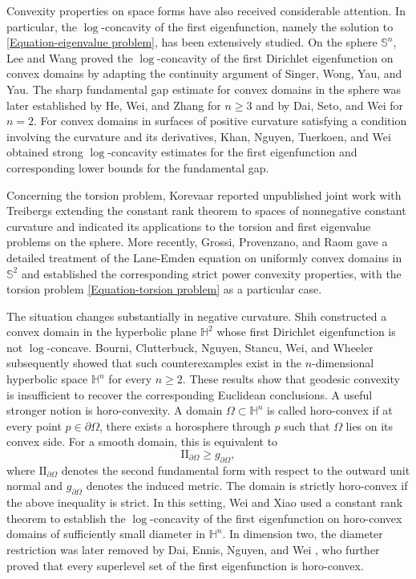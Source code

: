 \documentclass[11pt]{amsart}
\numberwithin{theorem}{section}
\numberwithin{equation}{section}
\begin{document}
Convexity properties on space forms have also received considerable attention. In particular, the $\log$-concavity of the first eigenfunction, namely the solution to \eqref{Equation-eigenvalue problem}, has been extensively studied. On the sphere $\mathbb{S}^n$, Lee and Wang \cite{Lee-Wang1987} proved the $\log$-concavity of the first Dirichlet eigenfunction on convex domains by adapting the continuity argument of  Singer, Wong, Yau, and Yau. The sharp fundamental gap estimate for convex domains in the sphere was later established by He, Wei, and Zhang \cite{He-WZ2020} for $n\geq 3$ and by Dai, Seto, and Wei \cite{Dai-SW2021} for $n=2$. For convex domains in surfaces of positive curvature satisfying a condition involving the curvature and its derivatives, Khan, Nguyen, Tuerkoen, and Wei \cite{Khan-NTW2025} obtained strong $\log$-concavity estimates for the first eigenfunction and corresponding lower bounds for the fundamental gap.

Concerning the torsion problem, Korevaar \cite{Korevaar1987} reported unpublished joint work with Treibergs extending the constant rank theorem to spaces of nonnegative constant curvature and indicated its applications to the torsion and first eigenvalue problems on the sphere. More recently, Grossi, Provenzano, and Raom \cite{Grossi-PRarXiv2026} gave a detailed treatment of the Lane-Emden equation on uniformly convex domains in $\mathbb{S}^2$ and established the corresponding strict power convexity properties, with the torsion problem \eqref{Equation-torsion problem} as a particular case.

The situation changes substantially in negative curvature. Shih \cite{Shih1989} constructed a convex domain in the hyperbolic plane $\mathbb{H}^2$ whose first Dirichlet eigenfunction is not $\log$-concave. Bourni, Clutterbuck, Nguyen, Stancu, Wei, and Wheeler \cite{Bourni-CNSWW2022} subsequently showed that such counterexamples exist in the $n$-dimensional hyperbolic space $\mathbb{H}^n$ for every $n\geq 2$. These results show that geodesic convexity is insufficient to recover the corresponding Euclidean conclusions. A useful stronger notion is horo-convexity. A domain $\Omega\subset\mathbb{H}^n$ is called horo-convex if at every point $p\in\partial\Omega$, there exists a horosphere through $p$ such that $\Omega$ lies on its convex side. For a smooth domain, this is equivalent to $$\mathrm{II}_{\partial\Omega}\geq g_{\partial\Omega},$$ where $\mathrm{II}_{\partial\Omega}$ denotes the second fundamental form with respect to the outward unit normal and $g_{\partial\Omega}$ denotes the induced metric. The domain is strictly horo-convex if the above inequality is strict. In this setting, Wei and Xiao \cite{Wei-Xiao2025} used a constant rank theorem to establish the $\log$-concavity of the first eigenfunction on horo-convex domains of sufficiently small diameter in $\mathbb{H}^n$. In dimension two, the diameter restriction was later removed by Dai, Ennis, Nguyen, and Wei \cite{Dai-ENW2026}, who further proved that every superlevel set of the first eigenfunction is horo-convex.
\end{document}
